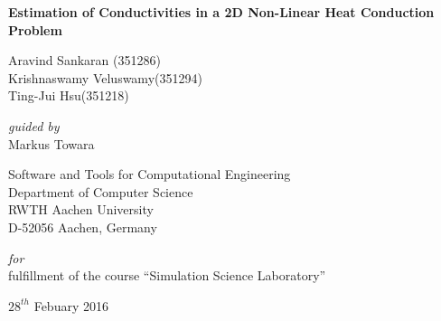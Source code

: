 \documentclass[10pt,a4paper]{report}
\begin{document}
{%
\thispagestyle{empty}
\centering
\Large

\vspace{5cm}
{\Large \textbf{Estimation of Conductivities in a 2D Non-Linear Heat Conduction Problem}}


\vspace{0.5cm}



\begin{normalsize}
Aravind Sankaran (351286)\\
Krishnaswamy Veluswamy(351294)\\ 
Ting-Jui Hsu(351218)

\end{normalsize}


\vspace{0.5cm}


\begin{normalsize}
\textit{guided by}\\
Markus Towara

\end{normalsize}

\vspace{0.5cm}


\begin{normalsize}
Software and Tools for Computational Engineering\\ 
Department of Computer Science\\ 
RWTH Aachen University\\ 
D-52056 Aachen, Germany\\

\end{normalsize}

\vspace{0.5cm}


\begin{normalsize}
\textit{for}\\
fulfillment of the course “Simulation Science Laboratory”

\end{normalsize}

\vspace{0.5cm}

{\normalsize $28^{th}$ Febuary 2016}

\vspace{\fill}
\pagebreak 


}
\end{document}
